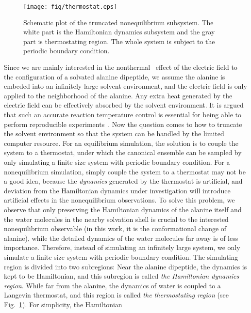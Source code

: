 \documentclass[a4paper,preprint,unsortedaddress,onecolumn]{revtex4-1}
\begin{document}
\begin{figure}
  \centering
  \texttt{[image: fig/thermostat.eps]}
  \caption{Schematic plot of the truncated nonequilibrium subsystem.
    The white part is the Hamiltonian dynamics subsystem
    and the gray part is thermostating region. The whole system
    is subject to the periodic boundary condition.}
  \label{fig:tmp2}
\end{figure}

Since we are mainly interested in the
nonthermal~\cite{delaHoz2005microwaves} effect of the electric field
to the configuration of a solvated alanine dipeptide, we assume the
alanine is embeded into an infinitely large solvent environment, and
the electric field is only applied to the neighborhood of the alanine.
Any extra heat generated by the electric field can be effectively
absorbed by the solvent environment.  It is argued that such an
accurate reaction temperature control is essential for being able to
perform reproducible experiments~\cite{damm2012can}.
Now the question comes to how to truncate the solvent environment
so that the system can be handled by the limited computer resource.
For an equilibrium simulation, the solution is to couple
the system to a thermostat, under which the canonical ensemble can be
sampled by only simulating a finite size system with periodic boundary
condition. For a nonequilibrium simulation, simply couple the system
to a thermostat may not be a good idea, because the \emph{dynamics}
generated by the thermostat is artificial, and deviation from the
Hamiltonian dynamics under investigation will introduce artificial
effects in the nonequilibrium observations. To solve this problem, we
observe that only preserving the Hamiltonian dynamics of the alanine 
itself and the water molecules in the nearby solvation shell is
crucial to the interested nonequilibrium observable
(in this work, it is the conformational change of alanine),
while the detailed dynamics of
the water molecules far away is of less importance. 
Therefore, instead of simulating an infinitely
large system, we only simulate a finite size system with periodic
boundary condition. The simulating region is divided into two
subregions: Near the alanine dipeptide, the dynamics is kept to be
Hamiltonian, and this subregion is called \emph{the Hamiltonian dynamics
region}. While far from the alanine, the dynamics of water is coupled
to a Langevin thermostat, and this region is called \emph{the thermostating
region} (see Fig.~\ref{fig:tmp2}).  For simplicity, the Hamiltonian
\end{document}
